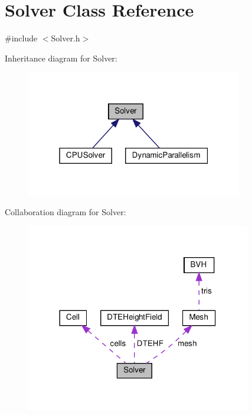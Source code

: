 \hypertarget{classSolver}{}\section{Solver Class Reference}
\label{classSolver}


{\ttfamily \#include $<$Solver.\+h$>$}



Inheritance diagram for Solver\+:
\nopagebreak
\begin{figure}[H]
\begin{center}
\leavevmode
\includegraphics[width=268pt]{classSolver__inherit__graph}
\end{center}
\end{figure}


Collaboration diagram for Solver\+:
\nopagebreak
\begin{figure}[H]
\begin{center}
\leavevmode
\includegraphics[width=278pt]{classSolver__coll__graph}
\end{center}
\end{figure}
